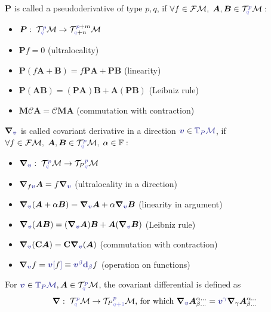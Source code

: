 \begin{definition}[Pseudoderivative]
\label{def:pseudoderivative}
    $\bm P$ is called a pseudoderivative of type $p,q$, if $\forall f\in\FM, \; \bm A,\bm B\in \TT^{\bluee p}_{\blueee q} \M: $
    \begin{itemize}
        \item $\bm P:\; \TT^{\bluee p}_{\blueee q}\M\rightarrow \TT^{\bluee p+m}_{\blueee q+n}\M$
        \item $\bm P f=0$ (ultralocality)
        \item $\bm P(f\bm A+\bm B)=f\bm P\bm A+\bm P \bm B$ (linearity)
        \item $\bm P(\bm{AB})=(\bm{PA})\bm B+ \bm A(\bm{PB})$ (Leibniz rule)
        \item $\bm M \mathcal C \bm A=\mathcal C\bm{MA}$ (commutation with contraction)
    \end{itemize}
\end{definition}

\begin{definition}
\label{def:covariantDerivative}
    $\bm\nabla_{\bluee{\bm v}}$ is called covariant derivative in a direction $\bluee{\bm v} \in \bluee{\T_P\M}$, if $\forall f\in\FM, \; \bm A,\bm B\in \TT^{\bluee p}_{\blueee q} \M,\; \alpha\in\mathbb F: $
    \begin{itemize}
        \item $\bm\nabla_{\bluee{\bm v}}:\; \TT^{\bluee p}_{\blueee q} \M \rightarrow {\TT_P}^{\bluee p}_{\blueee q} \M$
        \item $\bm\nabla_{f\bluee{\bm v}}\bm A=f\bm\nabla_{\bluee{\bm v}} $ (ultralocality in a direction)
        \item $\bm\nabla_{\bluee{\bm v}}(\bm A+\alpha \bm B)=\bm\nabla_{\bluee{\bm v}}\bm A+\alpha\bm\nabla_{\bluee{\bm v}}\bm B$ (linearity in argument)
        \item $\bm\nabla_{\bluee{\bm v}}(\bm{AB})=(\bm\nabla_{\bluee{\bm v}}\bm A)\bm B+\bm A(\bm\nabla_{\bluee{\bm v}}\bm B)$ (Leibniz rule)
        \item $\bm\nabla_{\bluee{\bm v}}(\mathbf C \bm A)=\mathbf C \bm\nabla_{\bluee{\bm v}}(\bm A)$ (commutation with contraction)
        \item $\bm\nabla_{\bluee{\bm v}}f=\bluee{\bm v[}f\bluee ]\equiv\bluee{\bm v^\beta \bm \d_\beta} f$ (operation on functions)
    \end{itemize}
\end{definition}

\begin{definition}
    For $\bluee{\bm v} \in \bluee{\T_P\M}, \bm A\in \TT^{\bluee p}_{\blueee q} \M$, the covariant differential is defined as
    $$\bm\nabla:\; \TT^{\bluee p}_{\blueee q} \M \rightarrow {\TT_P}^{\bluee p}_{\blueee{q+1}} \M
    \text{, for which } \bm\nabla_{\bluee{\bm v}}\bm A^{\alpha\dots}_{\beta\dots}=\bluee{\bm v^\gamma} \bm\nabla_{\gamma}\bm A^{\alpha\dots}_{\beta\dots}$$
\end{definition}

